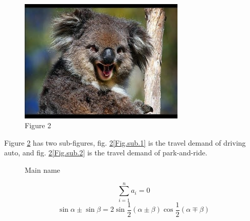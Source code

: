 \documentclass[11pt]{ctexart}
\begin{document}
\begin{figure}[H]
\centering 
\includegraphics[width=0.7\textwidth]{test.jpg} 
\caption{Figure 2}
\label{Report.2}
\end{figure}

Figure \ref{Fig.main} has two sub-figures, fig. \ref{Fig.main}\ref{Fig.sub.1} is the travel demand of driving auto, and fig. \ref{Fig.main}\ref{Fig.sub.2} is the travel demand of park-and-ride.
\begin{figure}[H]
\centering  %
\caption{Main name}
\label{Fig.main}
\end{figure}

$$\sum_{i=1}^n a_i=0$$
$$\sin{\alpha}\pm\sin{\beta}=2\sin{\frac{1}{2}\left(\alpha\pm\beta\right)}\cos{\frac{1}{2}\left(\alpha\mp\beta\right)}$$
\end{document}
